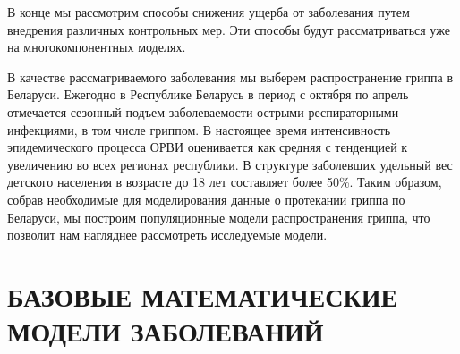 \documentclass[a4paper, 14pt]{extreport}
\numberwithin{equation}{section}
\begin{document}
	В конце мы рассмотрим способы снижения ущерба от заболевания путем внедрения различных контрольных мер. Эти способы будут рассматриваться уже на многокомпонентных моделях.
	
	В качестве рассматриваемого заболевания мы выберем распространение гриппа в Беларуси. Ежегодно в Республике Беларусь в период с октября по апрель отмечается сезонный подъем заболеваемости острыми респираторными инфекциями, в том числе гриппом. В настоящее время интенсивность эпидемического процесса ОРВИ оценивается как средняя с тенденцией к увеличению во всех регионах республики. В структуре заболевших удельный вес детского населения в возрасте до 18 лет составляет более 50\%. Таким образом, собрав необходимые для моделирования данные о протекании гриппа по Беларуси, мы построим популяционные модели распространения гриппа, что позволит нам нагляднее рассмотреть исследуемые модели.
	
	
	
	\newpage
	\chapter{БАЗОВЫЕ МАТЕМАТИЧЕСКИЕ МОДЕЛИ ЗАБОЛЕВАНИЙ}
\end{document}
